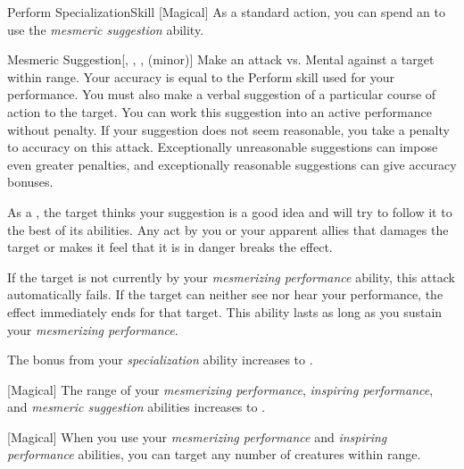 \begin{feat}{Perform Specialization}{Skill}
        [Magical] As a standard action, you can spend an  to use the \textit{mesmeric suggestion} ability.
        \begin{ability}{Mesmeric Suggestion}[, , ,  (minor)]
            Make an attack vs. Mental against a target within \rngmed range.
            Your accuracy is equal to the Perform skill used for your performance.
            You must also make a verbal suggestion of a particular course of action to the target.
            You can work this suggestion into an active performance without penalty.
            If your suggestion does not seem reasonable, you take a  penalty to accuracy on this attack.
            Exceptionally unreasonable suggestions can impose even greater penalties, and exceptionally reasonable suggestions can give accuracy bonuses.

            \hit As a , the target thinks your suggestion is a good idea and will try to follow it to the best of its abilities.
            Any act by you or your apparent allies that damages the target or makes it feel that it is in danger breaks the effect.

            If the target is not currently \fascinated by your \textit{mesmerizing performance} ability, this attack automatically fails.
            If the target can neither see nor hear your performance, the effect immediately ends for that target.
            This ability lasts as long as you sustain your \textit{mesmerizing performance}.
        \end{ability}

         The bonus from your \textit{specialization} ability increases to .

        [Magical] The range of your \textit{mesmerizing performance}, \textit{inspiring performance}, and \textit{mesmeric suggestion} abilities increases to \rnglong.

        [Magical] When you use your \textit{mesmerizing performance} and \textit{inspiring performance} abilities, you can target any number of creatures within range.
    \end{feat}

